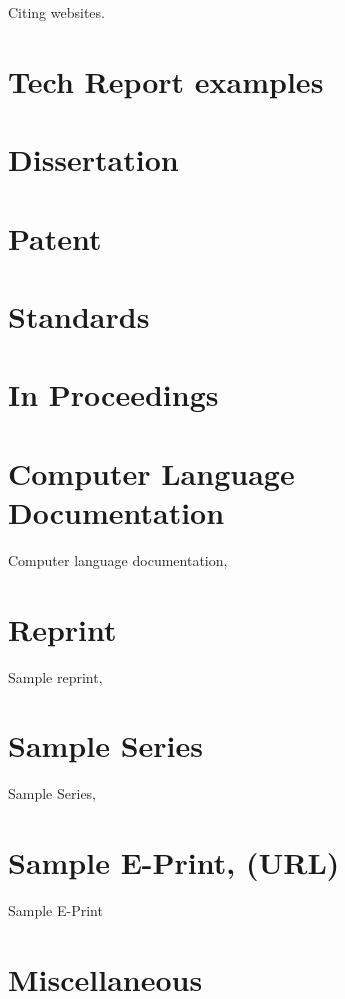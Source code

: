 \documentclass[preprint, NumberedRefs]{JASAnew}
\begin{document}
Citing websites\cite{website}.


\section*{Tech Report examples}
\cite{samptechreport3,samptechreport4}


\section*{Dissertation}
\cite{sampthesis}

\section*{Patent}

\cite{samppatent}

\section*{Standards}

\cite{sampstandards,sampstandards2}


\section*{In Proceedings}

 \cite{sampinproceedings2,
sampinproceedings3}

\section*{Computer Language Documentation}
Computer language documentation, 
\cite{sampcode,sampcode2}

\section*{Reprint}
Sample reprint, 
\cite{sampReprint}

\section*{Sample Series}
Sample Series, 
\cite{sampSeries}

\section*{Sample E-Print, (URL)}
 Sample E-Print 
\cite{sampEprint2}

\section*{Miscellaneous}
\cite{sampMisc}



\end{document}
